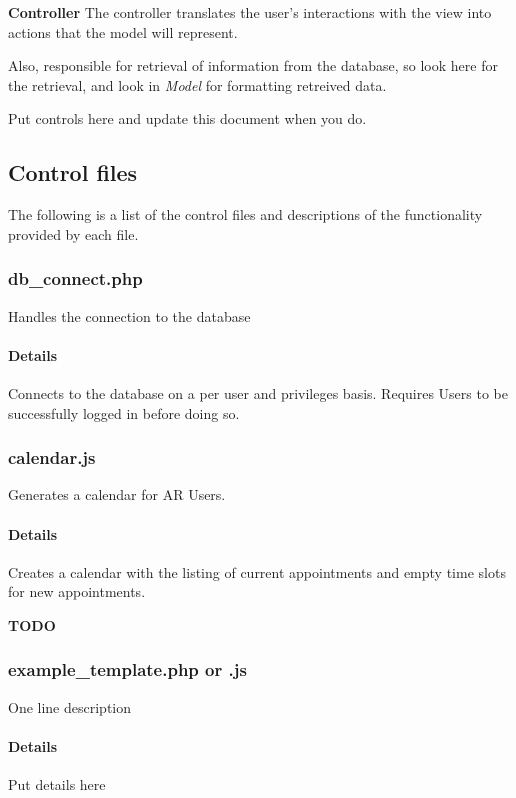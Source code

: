 {\bfseries Controller} The controller translates the user's interactions with the view into actions that the model will represent.

Also, responsible for retrieval of information from the database, so look here for the retrieval, and look in {\itshape Model} for formatting retreived data.

Put controls here and update this document when you do. 

 \subsection*{Control files}

The following is a list of the control files and descriptions of the functionality provided by each file. 

 \subsubsection*{db\-\_\-connect.\-php}

Handles the connection to the database

\paragraph*{Details}

Connects to the database on a per user and privileges basis. Requires Users to be successfully logged in before doing so. 

 \subsubsection*{calendar.\-js}

Generates a calendar for A\-R Users.

\paragraph*{Details}

Creates a calendar with the listing of current appointments and empty time slots for new appointments.

{\bfseries T\-O\-D\-O} 

 \subsubsection*{example\-\_\-template.\-php or .js}

One line description

\paragraph*{Details}

Put details here 